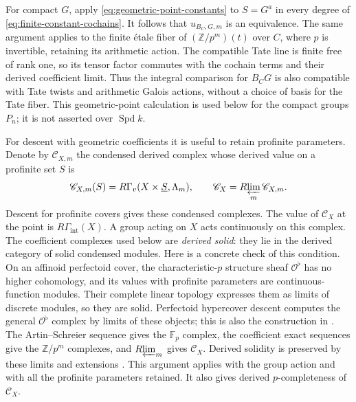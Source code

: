 \documentclass[11pt]{article}
\numberwithin{equation}{section}
\theoremstyle{definition}
\theoremstyle{remark}
\begin{document}
For compact $G$, apply \eqref{eq:geometric-point-constants} to
$S=G^a$ in every degree of \eqref{eq:finite-constant-cochains}.
It follows that $u_{B_C,G,m}$ is an equivalence.  The same argument
applies to the finite \'etale fiber of $(\mathbb Z/p^m)(t)$ over $C$,
where $p$ is invertible, retaining its arithmetic action.  The
compatible Tate line is finite free of rank one, so its tensor factor
commutes with the cochain terms and their derived coefficient limit.
Thus the integral comparison for
$B_CG$ is also compatible with Tate twists and arithmetic Galois
actions, without a choice of basis for the Tate fiber.  This
geometric-point calculation is used below for the compact groups
$P_n$; it is not asserted over $\operatorname{Spd} k$.

For descent with geometric coefficients it is useful to retain
profinite parameters.  Denote by $\mathscr C_{X,m}$ the condensed
derived complex whose derived value on a profinite set $S$ is
\[
 \mathscr C_{X,m}(S)=R\Gamma_v(X\times\underline S,\Lambda_m),
 \qquad \mathscr C_X=R\!\varprojlim_m\mathscr C_{X,m}.
\]
Descent for profinite covers gives these condensed complexes.  The value
of $\mathscr C_X$ at the point is $R\Gamma_{\mathrm{int}}(X)$.
A group acting on $X$ acts continuously
on this complex.  The coefficient complexes used below are
\emph{derived solid}: they lie in the derived category of solid
condensed modules.  Here is a concrete check of this condition.
On an affinoid perfectoid cover, the characteristic-$p$ structure
sheaf $\mathcal O^\flat$ has no higher cohomology, and its values with
profinite parameters are continuous-function modules.  Their complete
linear topology expresses them as limits of discrete modules, so
they are solid.  Perfectoid hypercover descent computes the general
$\mathcal O^\flat$ complex by limits of these objects; this is also the
construction in \cite[Theorem~3.2.1(iii) and Remark~3.2.2]{BMR2026}.
The Artin--Schreier
sequence gives the $\mathbb F_p$ complex, the coefficient exact sequences
give the $\mathbb Z/p^m$ complexes, and $R\!\varprojlim_m$ gives $\mathscr C_X$.
Derived solidity is preserved by these limits and extensions
\cite[Theorem~4.4(ii)]{Tang2026}.  This argument applies with the
group action and with all the profinite parameters retained.  It
also gives derived $p$-completeness of $\mathscr C_X$.
\end{document}
